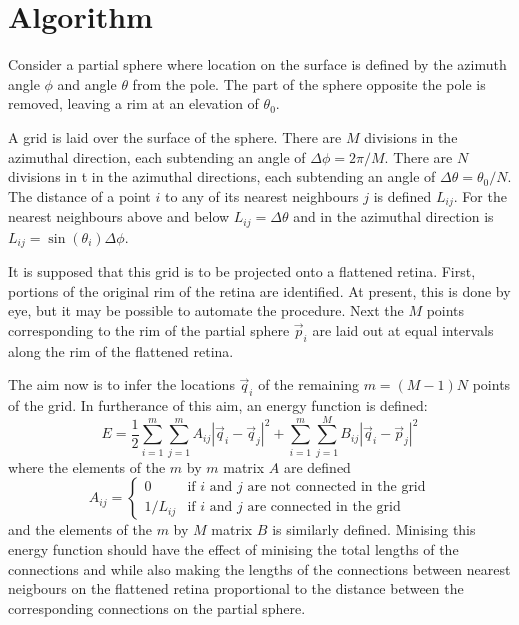\documentclass{article}
\begin{document}
\section{Algorithm}
\label{fold-retina:sec:method}

Consider a partial sphere where location on the surface is defined by
the azimuth angle $\phi$ and angle  $\theta$ from the pole. The part
of the sphere opposite the pole is removed, leaving a rim at an
elevation of $\theta_0$.

A grid is laid over the surface of the sphere.  There are $M$
divisions in the azimuthal direction, each subtending an angle of
$\Delta \phi=2\pi/M$. There are $N$ divisions in t in the azimuthal
directions, each subtending an angle of $\Delta\theta=\theta_0/N$. The
distance of a point $i$ to any of its nearest neighbours $j$ is
defined $L_{ij}$. For the nearest neighbours above and below $L_{ij} =
\Delta\theta$ and in the azimuthal direction is $L_{ij}
=\sin(\theta_i)\Delta \phi$.

It is supposed that this grid is to be projected onto a flattened
retina. First, portions of the original rim of the retina are
identified. At present, this is done by eye, but it may be possible to
automate the procedure. Next the $M$ points corresponding to the rim
of the partial sphere $\vec{p}_i$ are laid out at equal intervals
along the rim of the flattened retina. 

The aim now is to infer the locations $\vec{q}_i$ of the remaining
$m=(M-1)N$ points of the grid.  In furtherance of this aim, an energy
function is defined:
\begin{equation}
  \label{fold-retina:eq:1}
  E = \frac{1}{2} \sum_{i=1}^m \sum_{j=1}^m A_{ij} |\vec{q}_i - \vec{q}_j|^2
  + \sum_{i=1}^m \sum_{j=1}^M B_{ij} |\vec{q}_i - \vec{p}_j|^2
\end{equation}
where the elements of the $m$ by $m$ matrix $A$ are defined
\begin{equation}
  \label{fold-retina:eq:2}
  A_{ij} =\left\{
  \begin{array}{ll}
    0       & \mbox{if $i$ and $j$ are not connected in the grid} \\
    1/L_{ij} & \mbox{if $i$ and $j$ are  connected in the grid}
  \end{array}\right.
\end{equation}
and the elements of the $m$ by $M$ matrix $B$ is similarly defined.
Minising this energy function should have the effect of minising the
total lengths of the connections and while also making the lengths of
the connections between nearest neigbours on the flattened retina
proportional to the distance between the corresponding connections on
the partial sphere.
\end{document}
